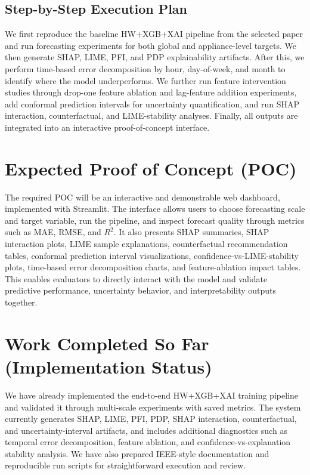 \documentclass[conference]{IEEEtran}
\begin{document}
\subsection{Step-by-Step Execution Plan}
We first reproduce the baseline HW+XGB+XAI pipeline from the selected paper and run forecasting experiments for both global and appliance-level targets. We then generate SHAP, LIME, PFI, and PDP explainability artifacts. After this, we perform time-based error decomposition by hour, day-of-week, and month to identify where the model underperforms. We further run feature intervention studies through drop-one feature ablation and lag-feature addition experiments, add conformal prediction intervals for uncertainty quantification, and run SHAP interaction, counterfactual, and LIME-stability analyses. Finally, all outputs are integrated into an interactive proof-of-concept interface.

\section{Expected Proof of Concept (POC)}
The required POC will be an interactive and demonstrable web dashboard, implemented with Streamlit. The interface allows users to choose forecasting scale and target variable, run the pipeline, and inspect forecast quality through metrics such as MAE, RMSE, and $R^2$. It also presents SHAP summaries, SHAP interaction plots, LIME sample explanations, counterfactual recommendation tables, conformal prediction interval visualizations, confidence-vs-LIME-stability plots, time-based error decomposition charts, and feature-ablation impact tables. This enables evaluators to directly interact with the model and validate predictive performance, uncertainty behavior, and interpretability outputs together.

\section{Work Completed So Far (Implementation Status)}
We have already implemented the end-to-end HW+XGB+XAI training pipeline and validated it through multi-scale experiments with saved metrics. The system currently generates SHAP, LIME, PFI, PDP, SHAP interaction, counterfactual, and uncertainty-interval artifacts, and includes additional diagnostics such as temporal error decomposition, feature ablation, and confidence-vs-explanation stability analysis. We have also prepared IEEE-style documentation and reproducible run scripts for straightforward execution and review.
\end{document}
